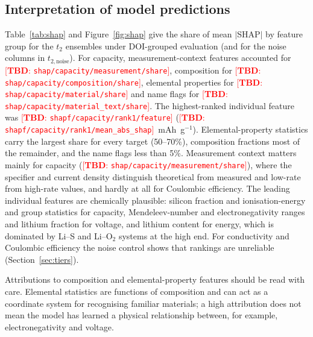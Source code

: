 \documentclass[journal=jcisd8,manuscript=article,layout=traditional]{achemso}
\newcommand{\TBD}[1]{\textcolor{red}{[\textbf{TBD}: \nolinkurl{#1}]}}
\begin{document}
\subsection{Interpretation of model predictions}
\label{sec:shap}

Table~\ref{tab:shap} and Figure~\ref{fig:shap} give the share of mean $|$SHAP$|$ by feature group for the $t_2$ ensembles under DOI-grouped evaluation (and for the noise columns in $t_{2,\mathrm{noise}}$). For capacity, measurement-context features accounted for \TBD{shap/capacity/measurement/share}, composition for \TBD{shap/capacity/composition/share}, elemental properties for \TBD{shap/capacity/material/share} and name flags for \TBD{shap/capacity/material_text/share}. The highest-ranked individual feature was \TBD{shapf/capacity/rank1/feature} (\TBD{shapf/capacity/rank1/mean_abs_shap}~mAh~g$^{-1}$). Elemental-property statistics carry the largest share for every target (50--70\%), composition fractions most of the remainder, and the name flags less than 5\%. Measurement context matters mainly for capacity (\TBD{shap/capacity/measurement/share}), where the specifier and current density distinguish theoretical from measured and low-rate from high-rate values, and hardly at all for Coulombic efficiency. The leading individual features are chemically plausible: silicon fraction and ionisation-energy and group statistics for capacity, Mendeleev-number and electronegativity ranges and lithium fraction for voltage, and lithium content for energy, which is dominated by Li--S and Li--O$_2$ systems at the high end. For conductivity and Coulombic efficiency the noise control shows that rankings are unreliable (Section~\ref{sec:tiers}).

Attributions to composition and elemental-property features should be read with care. Elemental statistics are functions of composition and can act as a coordinate system for recognising familiar materials; a high attribution does not mean the model has learned a physical relationship between, for example, electronegativity and voltage.
\end{document}
